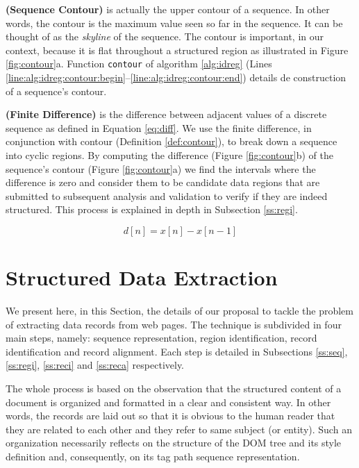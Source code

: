 \documentclass{vldb}
\begin{document}
\begin{definition}\textbf{(Sequence Contour)}\label{def:contour} is actually the
upper contour of a sequence. In other words, the contour is the maximum value
seen so far in the sequence. It can be thought of as the \textit{skyline} of the
sequence.
The contour is important, in our context, because it is flat throughout a
structured region as illustrated in Figure \ref{fig:contour}a. Function
\texttt{contour} of algorithm \ref{alg:idreg} (Lines
\ref{line:alg:idreg:contour:begin}--\ref{line:alg:idreg:contour:end}) details de
construction of a sequence's contour.
\end{definition}

\begin{definition}\textbf{(Finite Difference)}\label{def:diff} is the difference
between adjacent values of a discrete sequence as defined in Equation
\ref{eq:diff}.
We use the finite difference, in conjunction with contour (Definition
\ref{def:contour}), to break down a sequence into cyclic regions. 
By computing the difference (Figure \ref{fig:contour}b) of the sequence's
contour (Figure \ref{fig:contour}a) we find the intervals where the difference
is zero and consider them to be candidate data regions that are submitted to
subsequent analysis and validation to verify if they are indeed structured.
This process is explained in depth in Subsection \ref{ss:regi}.

\begin{equation}\label{eq:diff}
    d[n] = x[n] - x[n - 1]
\end{equation}
\end{definition}

\section{Structured Data Extraction}\label{sec:prop} We present here, in this
Section, the details of our proposal to tackle the problem of extracting data
records from web pages. The technique is subdivided in four main steps, namely:
sequence representation, region identification, record identification and record
alignment. Each step is detailed in Subsections \ref{ss:seq}, \ref{ss:regi},
\ref{ss:reci} and \ref{ss:reca} respectively.

The whole process is based on the observation that the structured content of a
document is organized and formatted in a clear and consistent way. In other
words, the records are laid out so that it is obvious to the human reader that
they are related to each other and they refer to same subject (or entity). Such
an organization necessarily reflects on the structure of the DOM tree and its
style definition and, consequently, on its tag path sequence representation.
\end{document}
